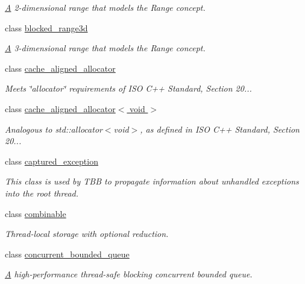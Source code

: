 \begin{DoxyCompactItemize}
\begin{DoxyCompactList}\small\item\em \hyperlink{structA}{A} 2-\/dimensional range that models the Range concept. \end{DoxyCompactList}\item 
class \hyperlink{classtbb_1_1blocked__range3d}{blocked\+\_\+range3d}
\begin{DoxyCompactList}\small\item\em \hyperlink{structA}{A} 3-\/dimensional range that models the Range concept. \end{DoxyCompactList}\item 
class \hyperlink{classtbb_1_1cache__aligned__allocator}{cache\+\_\+aligned\+\_\+allocator}
\begin{DoxyCompactList}\small\item\em Meets \char`\"{}allocator\char`\"{} requirements of I\+S\+O C++ Standard, Section 20... \end{DoxyCompactList}\item 
class \hyperlink{classtbb_1_1cache__aligned__allocator_3_01void_01_4}{cache\+\_\+aligned\+\_\+allocator$<$ void $>$}
\begin{DoxyCompactList}\small\item\em Analogous to std\+::allocator$<$void$>$, as defined in I\+S\+O C++ Standard, Section 20... \end{DoxyCompactList}\item 
class \hyperlink{classtbb_1_1captured__exception}{captured\+\_\+exception}
\begin{DoxyCompactList}\small\item\em This class is used by T\+B\+B to propagate information about unhandled exceptions into the root thread. \end{DoxyCompactList}\item 
class \hyperlink{classtbb_1_1combinable}{combinable}
\begin{DoxyCompactList}\small\item\em Thread-\/local storage with optional reduction. \end{DoxyCompactList}\item 
class \hyperlink{classtbb_1_1concurrent__bounded__queue}{concurrent\+\_\+bounded\+\_\+queue}
\begin{DoxyCompactList}\small\item\em \hyperlink{structA}{A} high-\/performance thread-\/safe blocking concurrent bounded queue. \end{DoxyCompactList}\item 

\end{DoxyCompactItemize}
